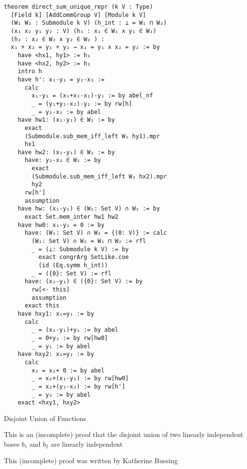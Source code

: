 \documentclass{beamer}
\begin{document}
\begin{verbatim}
theorem direct_sum_unique_repr (k V : Type) 
  [Field k] [AddCommGroup V] [Module k V]
  (W₁ W₂ : Submodule k V) (h_int : ⊥ = W₁ ⊓ W₂)
  (x₁ x₂ y₁ y₂ : V) (h₁ : x₁ ∈ W₁ ∧ y₁ ∈ W₁) 
  (h₂ : x₂ ∈ W₂ ∧ y₂ ∈ W₂ ) :
  x₁ + x₂ = y₁ + y₂ → x₁ = y₁ ∧ x₂ = y₂ := by
    have <hx1, hy1> := h₁
    have <hx2, hy2> := h₂
    intro h
    have h': x₁-y₁ = y₂-x₂ :=
      calc
        x₁-y₁ = (x₁+x₂-x₂)-y₁ := by abel_nf
        _ = (y₁+y₂-x₂)-y₁ := by rw[h]
        _ = y₂-x₂ := by abel
    have hw1: (x₁-y₁) ∈ W₁ := by
      exact 
      (Submodule.sub_mem_iff_left W₁ hy1).mpr 
      hx1
    have hw2: (x₁-y₁) ∈ W₂ := by
      have: y₂-x₂ ∈ W₂ := by
        exact 
        (Submodule.sub_mem_iff_left W₂ hx2).mpr 
        hy2
      rw[h']
      assumption
    have hw: (x₁-y₁) ∈ (W₁: Set V) ∩ W₂ := by
      exact Set.mem_inter hw1 hw2
    have hw0: x₁-y₁ = 0 := by
      have: (W₁: Set V) ∩ W₂ = {(0: V)} := calc
        (W₁: Set V) ∩ W₂ = W₁ ⊓ W₂ := rfl
        _ = (⊥: Submodule k V) := by
          exact congrArg SetLike.coe 
          (id (Eq.symm h_int))
        _ = ({0}: Set V) := rfl
      have: (x₁-y₁) ∈ ({0}: Set V) := by
        rw[<- this]
        assumption
      exact this
    have hxy1: x₁=y₁ := by
      calc
        _ = (x₁-y₁)+y₁ := by abel
        _ = 0+y₁ := by rw[hw0]
        _ = y₁ := by abel
    have hxy2: x₂=y₂ := by
      calc
        x₂ = x₂+ 0 := by abel
        _ = x₂+(x₁-y₁) := by rw[hw0]
        _ = x₂+(y₂-x₂) := by rw[h']
        _ = y₂ := by abel
    exact <hxy1, hxy2>
\end{verbatim}



\begin{frame} {Disjoint Union of Functions}
\item This is an (incomplete) proof that the disjoint union of two linearly independent bases $b_1$ and $b_2$ are linearly independent
\item This (incomplete) proof was written by Katherine Buesing 
\end{frame}
\end{document}
